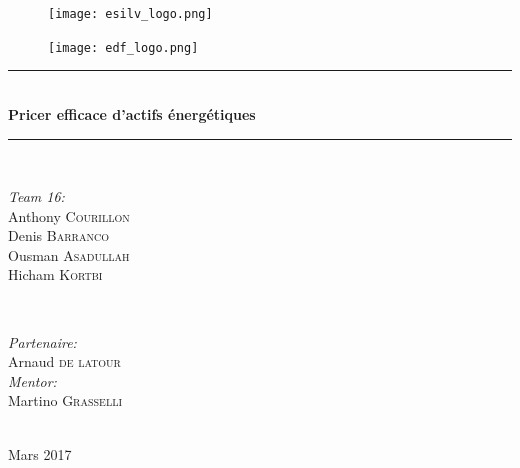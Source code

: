 \documentclass[12pt]{report}
\begin{document}
\begin{titlepage}

\newcommand{\HRule}{\rule{\linewidth}{0.5mm}} %

\begin{figure}
	\begin{minipage}[t]{.5\linewidth}
	\centering
	\texttt{[image: esilv\_logo.png]}\\[1cm]
	\end{minipage}
	\begin{minipage}[t]{.5\linewidth}
	\texttt{[image: edf\_logo.png]}\\[1cm]
	\end{minipage}
\end{figure}

\center %



\HRule \\[0.4cm]
{ \huge \bfseries Pricer efficace d'actifs énergétiques}\\[0.4cm] %
\HRule \\[1.5cm]


\begin{minipage}{0.4\textwidth}
	\begin{flushleft} \large
		\emph{Team 16:}\\
		Anthony \textsc{Courillon} %
		\\
		Denis \textsc{Barranco}
		\\
		Ousman \textsc{Asadullah}
		\\
		Hicham \textsc{Kortbi} %
	\end{flushleft}
\end{minipage}
~
\begin{minipage}{0.4\textwidth}
	\begin{flushright} \large
		\emph{Partenaire:} \\
		Arnaud \textsc{de latour} %
		\\
		\emph{Mentor:} \\
		Martino \textsc{Grasselli} %
	\end{flushright}
\end{minipage}\\[2cm]


{\large Mars 2017}\\[2cm] %

\end{titlepage}
\clearpage
\tableofcontents
\end{document}
